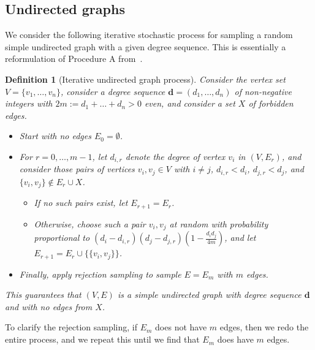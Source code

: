 \documentclass{article}
\theoremstyle{plain}
\theoremstyle{remark}
\theoremstyle{plain}
\newtheorem{definition}[theorem]{Definition}
\numberwithin{equation}{section}
\renewcommand{\d}{{\boldsymbol{d}}}
\begin{document}
	\subsection{Undirected graphs}\label{subsection_results_simple}
	
	We consider the following iterative stochastic process for sampling a random simple undirected graph with a given degree sequence. This is essentially a reformulation of Procedure A from~\cite{Bayati}.
	
	\begin{definition}[Iterative undirected graph process]\label{definition_process_simple}
		Consider the vertex set $V=\{v_1,\ldots,v_n\}$, consider a degree sequence $\d=(d_1,\ldots,d_n)$ of non-negative integers with $2m:=d_1+\ldots+d_n>0$ even, and consider a set $X$ of forbidden edges.
		\begin{itemize}
			\item Start with no edges $E_0=\emptyset$.
			\item For $r=0,\ldots,m-1$, let $d_{i,r}$ denote the degree of vertex $v_i$ in $(V,E_r)$, and consider those pairs of vertices $v_i,v_j\in V$ with $i\neq j$, $d_{i,r}<d_i$, $d_{j,r}<d_j$, and $\{v_i,v_j\}\not\in E_r\cup X$.
			\begin{itemize}
				\item If no such pairs exist, let $E_{r+1}=E_r$.
				\item Otherwise, choose such a pair $v_i,v_j$ at random with probability proportional to $(d_i-d_{i,r})(d_j-d_{j,r})(1-\tfrac{d_id_j}{4m})$, and let $E_{r+1}=E_r\cup\{\{v_i,v_j\}\}$.
			\end{itemize}
			\item Finally, apply rejection sampling to sample $E=E_m$ with $m$ edges.
		\end{itemize}
		This guarantees that $(V,E)$ is a simple undirected graph with degree sequence $\d$ and with no edges from $X$.
	\end{definition}
	
	To clarify the rejection sampling, if $E_m$ does not have $m$ edges, then we redo the entire process, and we repeat this until we find that $E_m$ does have $m$ edges.
	
\end{document}

